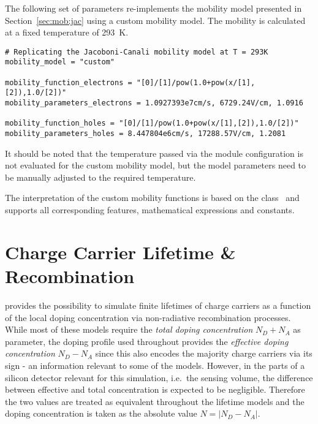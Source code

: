 The following set of parameters re-implements the mobility model presented in Section~\ref{sec:mob:jac} using a custom mobility model.
The mobility is calculated at a fixed temperature of \SI{293}{K}.
\begin{verbatim}
# Replicating the Jacoboni-Canali mobility model at T = 293K
mobility_model = "custom"

mobility_function_electrons = "[0]/[1]/pow(1.0+pow(x/[1],[2]),1.0/[2])"
mobility_parameters_electrons = 1.0927393e7cm/s, 6729.24V/cm, 1.0916

mobility_function_holes = "[0]/[1]/pow(1.0+pow(x/[1],[2]),1.0/[2])"
mobility_parameters_holes = 8.447804e6cm/s, 17288.57V/cm, 1.2081
\end{verbatim}

\begin{warning}
It should be noted that the temperature passed via the module configuration is not evaluated for the custom mobility model, but the model parameters need to be manually adjusted to the required temperature.
\end{warning}

The interpretation of the custom mobility functions is based on the  class~\cite{rootformula} and supports all corresponding features, mathematical expressions and constants.

\section{Charge Carrier Lifetime \& Recombination}
\label{sec:recombination}

\apsq provides the possibility to simulate finite lifetimes of charge carriers as a function of the local doping concentration via non-radiative recombination processes.
While most of these models require the \emph{total doping concentration} $N_D + N_A$ as parameter, the doping profile used throughout \apsq provides the \emph{effective doping concentration} $N_D - N_A$ since this also encodes the majority charge carriers via its sign - an information relevant to some of the models.
However, in the parts of a silicon detector relevant for this simulation, i.e.\ the sensing volume, the difference between effective and total concentration is expected to be negligible.
Therefore the two values are treated as equivalent throughout the lifetime models and the doping concentration is taken as the absolute value $N = \left|N_D - N_A\right|$.

